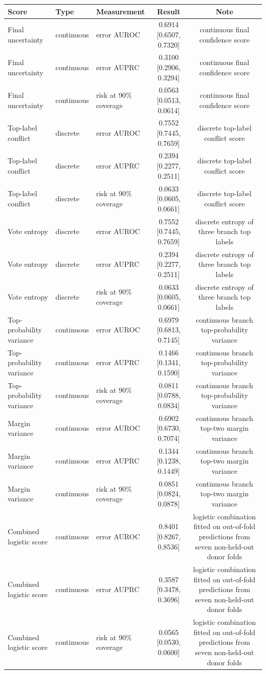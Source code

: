 \begin{tabular}{lllcc}
\toprule
Score & Type & Measurement & Result & Note \\
\midrule
Final uncertainty & continuous & error AUROC & 0.6914 [0.6507, 0.7320] & continuous final confidence score \\
Final uncertainty & continuous & error AUPRC & 0.3100 [0.2906, 0.3294] & continuous final confidence score \\
Final uncertainty & continuous & risk at 90\% coverage & 0.0563 [0.0513, 0.0614] & continuous final confidence score \\
Top-label conflict & discrete & error AUROC & 0.7552 [0.7445, 0.7659] & discrete top-label conflict score \\
Top-label conflict & discrete & error AUPRC & 0.2394 [0.2277, 0.2511] & discrete top-label conflict score \\
Top-label conflict & discrete & risk at 90\% coverage & 0.0633 [0.0605, 0.0661] & discrete top-label conflict score \\
Vote entropy & discrete & error AUROC & 0.7552 [0.7445, 0.7659] & discrete entropy of three branch top labels \\
Vote entropy & discrete & error AUPRC & 0.2394 [0.2277, 0.2511] & discrete entropy of three branch top labels \\
Vote entropy & discrete & risk at 90\% coverage & 0.0633 [0.0605, 0.0661] & discrete entropy of three branch top labels \\
Top-probability variance & continuous & error AUROC & 0.6979 [0.6813, 0.7145] & continuous branch top-probability variance \\
Top-probability variance & continuous & error AUPRC & 0.1466 [0.1341, 0.1590] & continuous branch top-probability variance \\
Top-probability variance & continuous & risk at 90\% coverage & 0.0811 [0.0788, 0.0834] & continuous branch top-probability variance \\
Margin variance & continuous & error AUROC & 0.6902 [0.6730, 0.7074] & continuous branch top-two margin variance \\
Margin variance & continuous & error AUPRC & 0.1344 [0.1238, 0.1449] & continuous branch top-two margin variance \\
Margin variance & continuous & risk at 90\% coverage & 0.0851 [0.0824, 0.0878] & continuous branch top-two margin variance \\
Combined logistic score & continuous & error AUROC & 0.8401 [0.8267, 0.8536] & logistic combination fitted on out-of-fold predictions from seven non-held-out donor folds \\
Combined logistic score & continuous & error AUPRC & 0.3587 [0.3478, 0.3696] & logistic combination fitted on out-of-fold predictions from seven non-held-out donor folds \\
Combined logistic score & continuous & risk at 90\% coverage & 0.0565 [0.0530, 0.0600] & logistic combination fitted on out-of-fold predictions from seven non-held-out donor folds \\
\bottomrule
\end{tabular}
